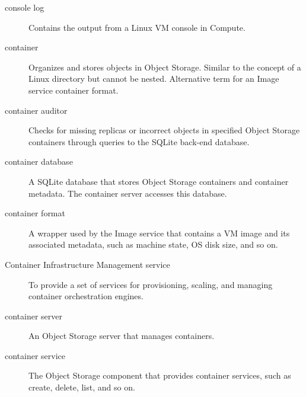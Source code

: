 \documentclass[letterpaper,10pt,english]{sphinxmanual}
\begin{document}
\begin{description}
\item[{console log}] \leavevmode{}\label{_source/glossary:term-console-log}
Contains the output from a Linux VM console in Compute.

\item[{container}] \leavevmode{}\label{_source/glossary:term-container}
Organizes and stores objects in Object Storage. Similar to the
concept of a Linux directory but cannot be nested. Alternative term
for an Image service container format.

\item[{container auditor}] \leavevmode{}\label{_source/glossary:term-container-auditor}
Checks for missing replicas or incorrect objects in specified
Object Storage containers through queries to the SQLite back-end
database.

\item[{container database}] \leavevmode{}\label{_source/glossary:term-container-database}
A SQLite database that stores Object Storage containers and
container metadata. The container server accesses this
database.

\item[{container format}] \leavevmode{}\label{_source/glossary:term-container-format}
A wrapper used by the Image service that contains a VM image and
its associated metadata, such as machine state, OS disk size, and so
on.

\item[{Container Infrastructure Management service}] \leavevmode{}\label{_source/glossary:term-container-infrastructure-management-service}
To provide a set of services for provisioning, scaling, and managing
container orchestration engines.

\item[{container server}] \leavevmode{}\label{_source/glossary:term-container-server}
An Object Storage server that manages containers.

\item[{container service}] \leavevmode{}\label{_source/glossary:term-container-service}
The Object Storage component that provides container services,
such as create, delete, list, and so on.


\end{description}
\end{document}
